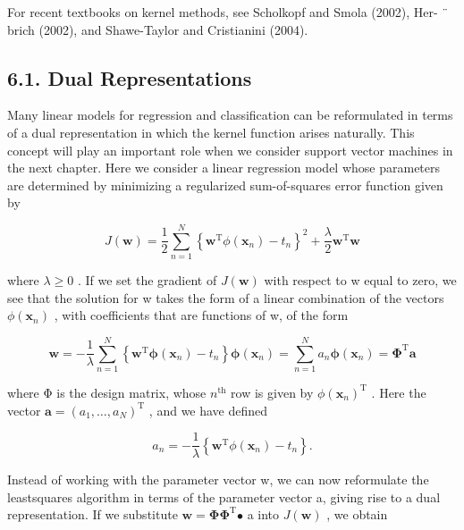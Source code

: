 \documentclass[
  10
]{article}
\begin{document}
For recent textbooks on kernel methods, see Scholkopf and Smola (2002),
Her- ¨ brich (2002), and Shawe-Taylor and Cristianini (2004).

\subsection{6.1. Dual Representations}\label{dual-representations}

Many linear models for regression and classification can be reformulated
in terms of a dual representation in which the kernel function arises
naturally. This concept will play an important role when we consider
support vector machines in the next chapter. Here we consider a linear
regression model whose parameters are determined by minimizing a
regularized sum-of-squares error function given by

\[
J (\mathbf {w}) = \frac {1}{2} \sum_ {n = 1} ^ {N} \left\{\mathbf {w} ^ {\mathrm{T}} \phi (\mathbf {x} _ {n}) - t _ {n} \right\} ^ {2} + \frac {\lambda}{2} \mathbf {w} ^ {\mathrm{T}} \mathbf {w}\tag{6.2}
\]

where \(\lambda \geqslant 0\) . If we set the gradient of
\(J ( \mathbf { w } )\) with respect to w equal to zero, we see that the
solution for w takes the form of a linear combination of the vectors
\(\phi (  { \mathbf { x } } _ { n } )\) , with coefficients that are
functions of w, of the form

\[
\mathbf {w} = - \frac {1}{\lambda} \sum_ {n = 1} ^ {N} \left\{\mathbf {w} ^ {\mathrm{T}} \boldsymbol {\phi} (\mathbf {x} _ {n}) - t _ {n} \right\} \boldsymbol {\phi} (\mathbf {x} _ {n}) = \sum_ {n = 1} ^ {N} a _ {n} \boldsymbol {\phi} (\mathbf {x} _ {n}) = \boldsymbol {\Phi} ^ {\mathrm{T}} \mathbf {a}\tag{6.3}
\]

where Φ is the design matrix, whose \(n ^ { \mathrm { t h } }\) row is
given by \(\phi ( \mathbf { x } _ { n } ) ^ { \mathrm { T } }\) . Here
the vector
\(\mathbf { a } = ( a _ { 1 } , \ldots , a _ { N } ) ^ { \mathrm { T } }\)
, and we have defined

\[
a _ {n} = - \frac {1}{\lambda} \left\{\mathbf {w} ^ {\mathrm{T}} \phi (\mathbf {x} _ {n}) - t _ {n} \right\}.\tag{6.4}
\]

Instead of working with the parameter vector w, we can now reformulate
the leastsquares algorithm in terms of the parameter vector a, giving
rise to a dual representation. If we substitute
\(\mathbf { w = \Phi \Phi ^ { \mathrm { T } } { \mathbf { \bullet } } }\)
a into \(J ( \mathbf { w } )\) , we obtain
\end{document}
